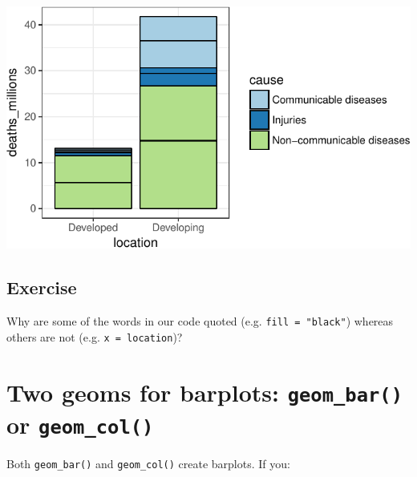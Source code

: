 \documentclass[12pt,]{krantz}
\makeatletter
\newenvironment{Shaded}{\begin{snugshade}}{\end{snugshade}}
\newcommand{\DataTypeTok}[1]{\textcolor[rgb]{0.13,0.29,0.53}{#1}}
\newcommand{\KeywordTok}[1]{\textcolor[rgb]{0.13,0.29,0.53}{\textbf{#1}}}
\newcommand{\NormalTok}[1]{#1}
\newcommand{\OperatorTok}[1]{\textcolor[rgb]{0.81,0.36,0.00}{\textbf{#1}}}
\newcommand{\StringTok}[1]{\textcolor[rgb]{0.31,0.60,0.02}{#1}}
\newenvironment{kframe}{%
\medskip{}
\setlength{\fboxsep}{.8em}
 \def\at@end@of@kframe{}%
 \ifinner\ifhmode%
  \def\at@end@of@kframe{\end{minipage}}%
  \begin{minipage}{\columnwidth}%
 \fi\fi%
 \def\FrameCommand##1{\hskip\@totalleftmargin \hskip-\fboxsep
 \colorbox{shadecolor}{##1}\hskip-\fboxsep
     \hskip-\linewidth \hskip-\@totalleftmargin \hskip\columnwidth}%
 \MakeFramed {\advance\hsize-\width
   \@totalleftmargin\z@ \linewidth\hsize
   \@setminipage}}%
 {\par\unskip\endMakeFramed%
 \at@end@of@kframe}
\renewenvironment{Shaded}{\begin{kframe}}{\end{kframe}}
\theoremstyle{definition}
\theoremstyle{definition}
\theoremstyle{definition}
\theoremstyle{remark}
\makeatother
\begin{document}
\begin{Shaded}
\end{Shaded}

\includegraphics{01_first_interaction_files/figure-latex/unnamed-chunk-8-1.pdf}

\hypertarget{exercise-2}{%
\subsection{Exercise}\label{exercise-2}}

Why are some of the words in our code quoted (e.g.
\texttt{fill\ =\ "black"}) whereas others are not (e.g.
\texttt{x\ =\ location})?

\hypertarget{two-geoms-for-barplots-geom_bar-or-geom_col}{%
\section{\texorpdfstring{Two geoms for barplots: \texttt{geom\_bar()} or
\texttt{geom\_col()}}{Two geoms for barplots: geom\_bar() or geom\_col()}}\label{two-geoms-for-barplots-geom_bar-or-geom_col}}

Both \texttt{geom\_bar()} and \texttt{geom\_col()} create barplots. If
you:
\end{document}
